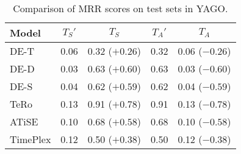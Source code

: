 \begin{table*}[htb]
\centering
\begin{minipage}{0.95\textwidth}
\centering
\caption{Comparison of MRR scores on test sets in YAGO.}
\vspace{-3mm}

\begin{tabular}{l|cc|cc}\hline
Model & $T_S'$ & $T_S$ & $T_A'$ & $T_A$ \\ \hline
DE-T & 0.06 & 0.32 (\textcolor{textgreen}{$+0.26$}) & 0.32 & 0.06 (\textcolor{textred}{$-0.26$}) \\ 
DE-D & 0.03 & 0.63 (\textcolor{textgreen}{$+0.60$}) & 0.63 & 0.03 (\textcolor{textred}{$-0.60$}) \\ 
DE-S & 0.04 & 0.62 (\textcolor{textgreen}{$+0.59$}) & 0.62 & 0.04 (\textcolor{textred}{$-0.59$}) \\ 
TeRo & 0.13 & 0.91 (\textcolor{textgreen}{$+0.78$}) & 0.91 & 0.13 (\textcolor{textred}{$-0.78$}) \\ 
ATiSE & 0.10 & 0.68 (\textcolor{textgreen}{$+0.58$}) & 0.68 & 0.10 (\textcolor{textred}{$-0.58$}) \\ 
TimePlex & 0.12 & 0.50 (\textcolor{textgreen}{$+0.38$}) & 0.50 & 0.12 (\textcolor{textred}{$-0.38$}) \\ 
 \hline
\end{tabular}

\label{tab:relation_properties_yago11k_comparison}
\end{minipage}
\end{table*}

